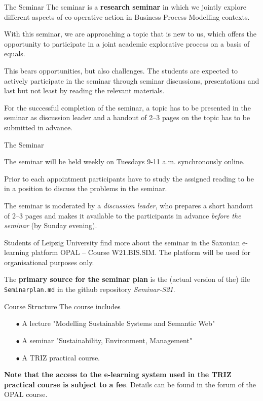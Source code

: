 \documentclass{beamer}
\begin{document}
\begin{frame}{The Seminar}
The seminar is a \textbf{research seminar} in which we jointly explore
different aspects of co-operative action in Business Process Modelling
contexts.

With this seminar, we are approaching a topic that is new to us, which offers
the opportunity to participate in a joint academic explorative process on a
basis of equals.

This bears opportunities, but also challenges.  The students are expected to
actively participate in the seminar through seminar discussions, presentations
and last but not least by reading the relevant materials.

For the successful completion of the seminar, a topic has to be presented in
the seminar as discussion leader and a handout of 2--3 pages on the topic has
to be submitted in advance.
\end{frame}

\begin{frame}{The Seminar}

The seminar will be held weekly on Tuesdays 9-11 a.m. synchronously online.

Prior to each appointment participants have to study the assigned reading to
be in a position to discuss the problems in the seminar.

The seminar is moderated by a \emph{discussion leader}, who prepares a short
handout of 2--3 pages and makes it available to the participants in advance
\emph{before the seminar} (by Sunday evening).

Students of Leipzig University find more about the seminar in the Saxonian
e-learning platform OPAL -- Course W21.BIS.SIM.  The platform will be used for
organisational purposes only.

The \textbf{primary source for the seminar plan} is the (actual version of
the) file \texttt{Seminarplan.md} in the github repository \emph{Seminar-S21}.
\end{frame}

\begin{frame}{Course Structure}
The course includes
\begin{itemize}
\item[$\bullet$] A lecture "Modelling Sustainable Systems and Semantic Web"
\item[$\bullet$] A seminar "Sustainability, Environment, Management"
\item[$\bullet$] A TRIZ practical course.
\end{itemize}
\textbf{Note that the access to the e-learning system used in the TRIZ
  practical course is subject to a fee}. Details can be found in the forum of
the OPAL course.
\end{frame}
\end{document}
